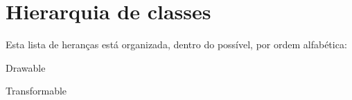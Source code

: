 \section{Hierarquia de classes}
Esta lista de heranças está organizada, dentro do possível, por ordem alfabética\+:\begin{DoxyCompactList}
\item Drawable\begin{DoxyCompactList}
\item {}
\item {}
\end{DoxyCompactList}
\item {}
\item Transformable\begin{DoxyCompactList}
\item {}
\item {}
\end{DoxyCompactList}
\end{DoxyCompactList}
